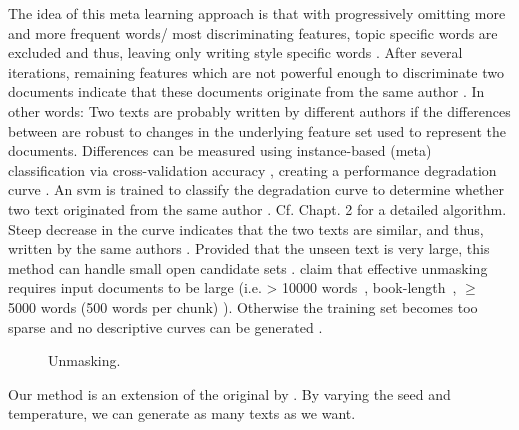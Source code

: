 \begin{definition}
    [Unmasking]
    The idea of this meta learning approach is that with progressively omitting more and more frequent words/ 
    most discriminating features, 
    topic specific words are excluded and thus, leaving only writing style specific words \citep{stein_intrinsic_2011}.
    After several iterations, remaining features which are not powerful enough to discriminate two documents indicate that 
    these documents originate from the same author \citep{stein_intrinsic_2011,tyo_state_2022,bevendorff_divergence_based_2020,koppel_authorship_2004}.
    In other words: 
    Two texts are probably written by different authors if the differences between are robust to changes in the underlying feature set used to represent the documents.
    Differences can be measured using instance-based (meta) classification via cross-validation accuracy 
    \citep{koppel_authorship_2011,bevendorff_generalizing_2019,bevendorff_divergence_based_2020,potthast_stylometric_2018,koppel_authorship_2004}, 
    creating a performance degradation curve \citep{tyo_state_2022,koppel_authorship_2004}.
    An \ac{svm} is trained to classify the degradation curve to determine whether two text originated from the same author 
    \citep{tyo_state_2022,bevendorff_generalizing_2019,koppel_authorship_2004}.
    Cf. \citep{bevendorff_divergence_based_2020} Chapt. 2 for a detailed algorithm.
    Steep decrease in the curve indicates that the two texts are similar, and thus, 
    written by the same authors \citep{potthast_stylometric_2018,koppel_authorship_2004}.
    Provided that the unseen text is very large, this method can handle small open candidate sets \citep{koppel_authorship_2011}.
    \citet{koppel_determining_2014,bevendorff_generalizing_2019} claim that effective unmasking requires input documents to be large 
    (i.e. > 10000 words~\citep{koppel_determining_2014}, book-length~\citep{bevendorff_generalizing_2019}, 
    $\geq$ 5000 words (500 words per chunk) \citep{bevendorff_divergence_based_2020}).
    Otherwise the training set becomes too sparse and no descriptive curves can be generated 
    \citep{bevendorff_generalizing_2019,bevendorff_divergence_based_2020}.
\end{definition}



\begin{figure}[htbp]
    \centering
    
    \caption{Unmasking.}
    \label{fig:unmasking}
\end{figure}
Our method is an extension of the original \impAppr{} by \citet{koppel_determining_2014}.
By varying the seed and temperature, we can generate as many texts as we want.
  
